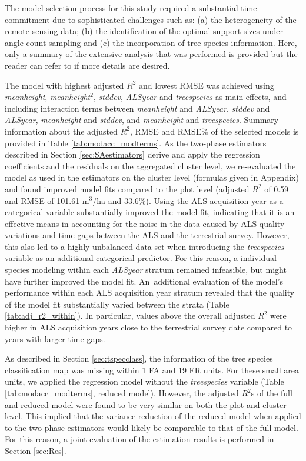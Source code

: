 \documentclass[remotesensing,article,accept,moreauthors,pdftex,10pt,a4paper]{Definitions/mdpi}
\newcommand{\adjrsq}{adjusted $R^2$}
\newcommand{\mha}{m$^3$/ha}
\newcommand{\meanheight}{\textit{meanheight}}
\newcommand{\stddev}{\textit{stddev}}
\newcommand{\treespecies}{\textit{treespecies}}
\newcommand{\alsyear}{\textit{ALSyear}}
\begin{document}
The model selection process for this study required a substantial time commitment due to sophisticated challenges such as: (a) the heterogeneity of the remote sensing data; (b) the identification of the optimal support sizes under angle count sampling and (c) the incorporation of tree species information. Here, only a summary of the extensive analysis that was performed is provided but the reader can refer to \citet{hill2017a} if more details are desired.\par
The model with highest \adjrsq{} and lowest RMSE was achieved using \meanheight{}, \meanheight{}$^2$, \stddev{}, \alsyear{} and \treespecies{} as main effects, and including interaction terms between \meanheight{} and \alsyear{}, \stddev{} and \alsyear{}, \meanheight{} and \stddev{}, and \meanheight{} and \treespecies{}. Summary information about the \adjrsq{}, RMSE and RMSE\% of the selected models is provided in Table \ref{tab:modacc_modterms}. As the two-phase estimators described in Section \ref{sec:SAestimators} derive and apply the regression coefficients and the residuals on the aggregated cluster level, we re-evaluated the model as used in the estimators on the cluster level (formulas given in Appendix) and found improved model fits compared to the plot level (\adjrsq{} of 0.59 and RMSE of 101.61 \mha{} and 33.6\%). Using the ALS acquisition year as a categorical variable substantially improved the model fit, indicating that it is an effective means in accounting for the noise in the data caused by ALS quality variations and time-gaps between the ALS and the terrestrial survey. However, this also led to a highly unbalanced data set when introducing the \treespecies{} variable as an additional categorical predictor. For this reason, a individual species modeling within each \alsyear{} stratum remained infeasible, but might have further improved the model fit. An~additional evaluation of the model's performance within each ALS acquisition year stratum revealed that the quality of the model fit substantially varied between the strata (Table \ref{tab:adj_r2_within}). In particular, values above the overall \adjrsq{} were higher in ALS acquisition years close to the terrestrial survey date compared to years with larger time gaps.\par
As described in Section \ref{sec:tspecclass}, the information of the tree species classification map was missing within 1 FA and 19 FR units. For these small area units, we applied the regression model without the \treespecies{} variable (Table \ref{tab:modacc_modterms}, reduced model). However, the \adjrsq{}s of the full and reduced model were found to be very similar on both the plot and cluster level. This implied that the variance reduction of the reduced model when applied to the two-phase estimators would likely be comparable to that of the full model. For this reason, a joint evaluation of the estimation results is performed in Section \ref{sec:Res}.
\end{document}
